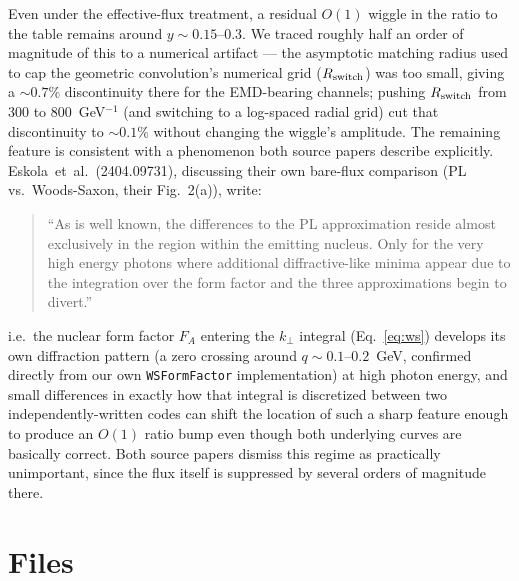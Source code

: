 \documentclass[11pt]{article}
\begin{document}
Even under the effective-flux treatment, a residual $O(1)$ wiggle in the
ratio to the table remains around $y\sim0.15$--$0.3$. We traced roughly half an order of magnitude of
this to a numerical artifact --- the asymptotic matching radius used to cap
the geometric convolution's numerical grid ($R_{\rm switch}$) was too
small, giving a $\sim0.7\%$ discontinuity there for the EMD-bearing
channels; pushing $R_{\rm switch}$ from 300 to 800~GeV$^{-1}$ (and
switching to a log-spaced radial grid) cut that discontinuity to
$\sim0.1\%$ without changing the wiggle's amplitude. The remaining feature
is consistent with a phenomenon both source papers describe explicitly.
Eskola~et~al.\ (2404.09731), discussing their own bare-flux comparison
(PL vs.\ Woods-Saxon, their Fig.~2(a)), write:
\begin{quote}
``As is well known, the differences to the PL approximation reside almost
exclusively in the region within the emitting nucleus. Only for the very
high energy photons where additional diffractive-like minima appear due
to the integration over the form factor and the three approximations
begin to divert.''
\end{quote}
i.e.\ the nuclear form factor $F_A$ entering the $k_\perp$ integral
(Eq.~\eqref{eq:ws}) develops its own diffraction pattern (a zero crossing
around $q\sim0.1$--$0.2$~GeV, confirmed directly from our own
\texttt{WSFormFactor} implementation) at high photon energy, and small
differences in exactly how that integral is discretized between two
independently-written codes can shift the location of such a sharp feature
enough to produce an $O(1)$ ratio bump even though both underlying curves
are basically correct. Both source papers dismiss this regime as
practically unimportant, since the flux itself is suppressed by several
orders of magnitude there.

\section{Files}
\end{document}

